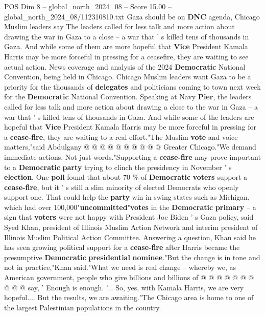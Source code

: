 \begin{textsample}{POS Dim 8 – global\_north\_2024\_08 – Score 15.00 – global\_north\_2024\_08/112310810.txt}  \label{ex:f8_pos_036}
Gaza should be on \textbf{DNC} agenda, Chicago Muslim leaders say The leaders called for less talk and more action about drawing the war in Gaza to a close -- a war that ' s killed tens of thousands in Gaza.
And while some of them are more hopeful that \textbf{Vice} President Kamala Harris may be more forceful in pressing for a ceasefire, they are waiting to see actual action.
News coverage and analysis of the 2024 \textbf{Democratic} National Convention, being held in Chicago.
Chicago Muslim leaders want Gaza to be a priority for the thousands of \textbf{delegates} and politicians coming to town next week for the \textbf{Democratic} National Convention.
Speaking at Navy \textbf{Pier}, the leaders called for less talk and more action about drawing a close to the war in Gaza -- a war that ' s killed tens of thousands in Gaza.
And while some of the leaders are hopeful that \textbf{Vice} President Kamala Harris may be more forceful in pressing for a \textbf{cease-fire}, they are waiting to a real effort."The Muslim \textbf{vote} and voice matters,"said Abdulgany @ @ @ @ @ @ @ @ @ @ Greater Chicago."We demand immediate actions.
Not just words."Supporting a \textbf{cease-fire} may prove important to a \textbf{Democratic} \textbf{party} trying to clinch the presidency in November ' s \textbf{election}.
One \textbf{poll} found that about 70 \% of \textbf{Democratic} \textbf{voters} support a \textbf{cease-fire}, but it ' s still a slim minority of elected Democrats who openly support one.
That could help the \textbf{party} win in swing states such as Michigan, which had over 100,000"\textbf{uncommitted}"\textbf{votes} in the \textbf{Democratic} \textbf{primary} -- a sign that \textbf{voters} were not happy with President Joe Biden ' s Gaza policy, said Syed Khan, president of Illinois Muslim Action Network and interim president of Illinois Muslim Political Action Committee.
Answering a question, Khan said he has seen growing political support for a \textbf{cease-fire} after Harris became the presumptive \textbf{Democratic} \textbf{presidential} \textbf{nominee}."But the change is in tone and not in practice,"Khan said."What we need is real change -- whereby we, as American government, people who give billions and billions of @ @ @ @ @ @ @ @ @ @ say, ' Enough is enough. '...
So, yes, with Kamala Harris, we are very hopeful....
But the results, we are awaiting."The Chicago area is home to one of the largest Palestinian populations in the country.

\end{textsample}

